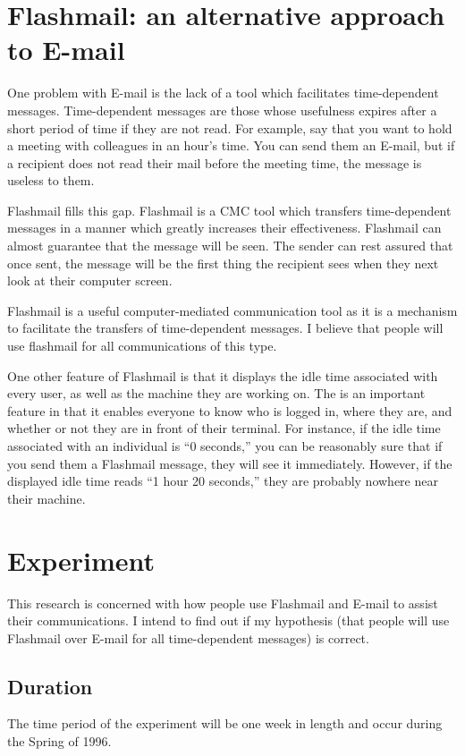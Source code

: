 \section{Flashmail: an alternative approach to E-mail}
One problem with E-mail is the lack of a tool which facilitates
time-dependent messages.  Time-dependent messages are those whose
usefulness expires after a short period of time if they are not read.  For
example, say that you want to hold a meeting with colleagues in an hour's
time.  You can send them an E-mail, but if a recipient does not read their
mail before the meeting time, the message is useless to them.

Flashmail fills this gap.  Flashmail is a CMC tool which transfers
time-dependent messages in a manner which greatly increases their
effectiveness.  Flashmail can almost guarantee that the message will be
seen.  The sender can rest assured that once sent, the message will be the
first thing the recipient sees when they next look at their computer
screen.

Flashmail is a useful computer-mediated communication tool as it is a
mechanism to facilitate the transfers of time-dependent messages.  I
believe that people will use flashmail for all communications of this type.

One other feature of Flashmail is that it displays the idle time associated
with every user, as well as the machine they are working on.  The is an
important feature in that it enables everyone to know who is logged in,
where they are, and whether or not they are in front of their terminal.
For instance, if the idle time associated with an individual is ``0
seconds,'' you can be reasonably sure that if you send them a Flashmail
message, they will see it immediately.  However, if the displayed idle time
reads ``1 hour 20 seconds,'' they are probably nowhere near their
machine.

\section{Experiment}
This research is concerned with how people use Flashmail and E-mail to
assist their communications. I intend to find out if my hypothesis (that
people will use Flashmail over E-mail for all time-dependent messages) is
correct.
\subsection{Duration}
The time period of the experiment will be one week in length and occur
during the Spring of 1996.

